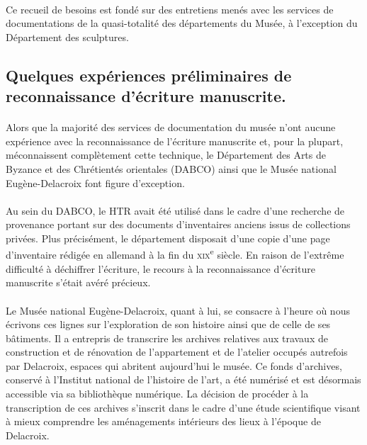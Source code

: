 \documentclass[a4paper,12pt,twoside]{book}
\begin{document}
\paragraph{}
Ce recueil de besoins est fondé sur des entretiens menés avec les services de documentations de la quasi-totalité des départements du Musée, à l’exception du Département des sculptures. 

\subsection{Quelques expériences préliminaires de reconnaissance d'écriture manuscrite.}

\paragraph{}
Alors que la majorité des services de documentation du musée n'ont aucune expérience avec la reconnaissance de l'écriture manuscrite et, pour la plupart, méconnaissent complètement cette technique, le Département des Arts de Byzance et des Chrétientés orientales (DABCO) ainsi que le Musée national Eugène-Delacroix font figure d'exception. 

\paragraph{}
Au sein du DABCO, le HTR avait été utilisé dans le cadre d'une recherche de provenance portant sur des documents d'inventaires anciens issus de collections privées. Plus précisément, le département disposait d'une copie d'une page d'inventaire rédigée en allemand à la fin du \textsc{xix}\textsuperscript{e} siècle. En raison de l'extrême difficulté à déchiffrer l'écriture, le recours à la reconnaissance d'écriture manuscrite s'était avéré précieux.

\paragraph{}
Le Musée national Eugène-Delacroix, quant à lui, se consacre à l’heure où nous écrivons ces lignes sur l'exploration de son histoire ainsi que de celle de ses bâtiments. Il a entrepris de transcrire les archives relatives aux travaux de construction et de rénovation de l'appartement et de l'atelier occupés autrefois par Delacroix, espaces qui abritent aujourd'hui le musée. Ce fonds d'archives, conservé à l’Institut national de l’histoire de l'art, a été numérisé et est désormais accessible via sa bibliothèque numérique. La décision de procéder à la transcription de ces archives s'inscrit dans le cadre d'une étude scientifique visant à mieux comprendre les aménagements intérieurs des lieux à l'époque de Delacroix. 
\end{document}
